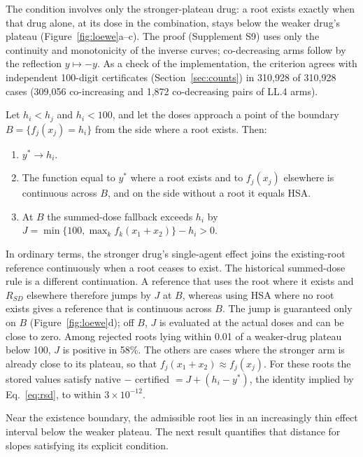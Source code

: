 \documentclass[11pt]{article}
\begin{document}
The condition involves only the stronger-plateau drug: a root exists exactly when that drug alone, at its dose in the combination, stays below the weaker drug's plateau (Figure~\ref{fig:loewe}a--c). The proof (Supplement S9) uses only the continuity and monotonicity of the inverse curves; co-decreasing arms follow by the reflection $y\mapsto-y$. As a check of the implementation, the criterion agrees with independent 100-digit certificates (Section~\ref{sec:counts}) in 310,928 of 310,928 cases (309,056 co-increasing and 1,872 co-decreasing pairs of LL.4 arms).

\begin{proposition}\label{prop:jump}
Let $h_i<h_j$ and $h_i<100$, and let the doses approach a point of the boundary $B=\{f_j(x_j)=h_i\}$ from the side where a root exists. Then:
\begin{enumerate}
\item $y^*\to h_i$.
\item The function equal to $y^*$ where a root exists and to $f_j(x_j)$ elsewhere is continuous across $B$, and on the side without a root it equals HSA.
\item At $B$ the summed-dose fallback exceeds $h_i$ by $J=\min\{100,\max_kf_k(x_1+x_2)\}-h_i>0$.
\end{enumerate}
\end{proposition}

In ordinary terms, the stronger drug's single-agent effect joins the existing-root reference continuously when a root ceases to exist. The historical summed-dose rule is a different continuation. A reference that uses the root where it exists and $R_{SD}$ elsewhere therefore jumps by $J$ at $B$, whereas using HSA where no root exists gives a reference that is continuous across $B$. The jump is guaranteed only on $B$ (Figure~\ref{fig:loewe}d); off $B$, $J$ is evaluated at the actual doses and can be close to zero. Among rejected roots lying within 0.01 of a weaker-drug plateau below 100, $J$ is positive in 58\%. The others are cases where the stronger arm is already close to its plateau, so that $f_j(x_1+x_2)\approx f_j(x_j)$. For these roots the stored values satisfy native − certified $= J + (h_i-y^*)$, the identity implied by Eq.~\eqref{eq:rsd}, to within $3\times10^{-12}$.

Near the existence boundary, the admissible root lies in an increasingly thin effect interval below the weaker plateau. The next result quantifies that distance for slopes satisfying its explicit condition.
\end{document}
